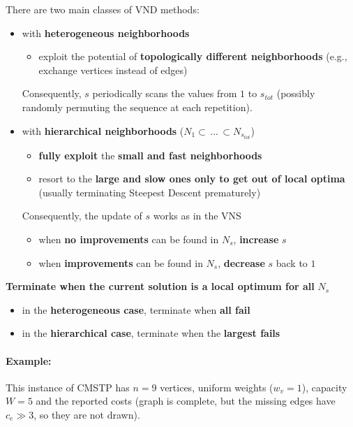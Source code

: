 There are two main classes of VND methods:
\begin{itemize}
	\item with \textbf{heterogeneous neighborhoods}
	\begin{itemize}
		\item exploit the potential of \textbf{topologically different neighborhoods} (e.g., exchange vertices instead of edges)
	\end{itemize}
	Consequently, $s$ periodically scans the values from $1$ to $s_{tot}$ (possibly randomly permuting the sequence at each repetition).\\
	
	\item with \textbf{hierarchical neighborhoods} ($N_1 \subset \, ... \, \subset N_{s_{tot}}$)
	\begin{itemize}
		\item \textbf{fully exploit} the \textbf{small and fast neighborhoods}
		\item resort to the \textbf{large and slow ones only to get out of local optima} (usually terminating Steepest Descent prematurely)
	\end{itemize}
	Consequently, the update of $s$ works as in the VNS
	\begin{itemize}
		\item when \textbf{no improvements} can be found in $N_s$, \textbf{increase} $s$
		\item when \textbf{improvements} can be found in $N_s$, \textbf{decrease} $s$ back to $1$
	\end{itemize}
\end{itemize}

\textbf{Terminate when the current solution is a local optimum for all} $N_s$
\begin{itemize}
	\item in the \textbf{heterogeneous case}, terminate when \textbf{all fail}
	\item in the \textbf{hierarchical case}, terminate when the \textbf{largest fails}
\end{itemize}

\newpage

\paragraph{Example:} This instance of CMSTP has $n = 9$ vertices, uniform weights ($w_v = 1$), capacity $W = 5$ and the reported costs (graph is complete, but the missing edges have $c_e \gg 3$, so they are not drawn).

